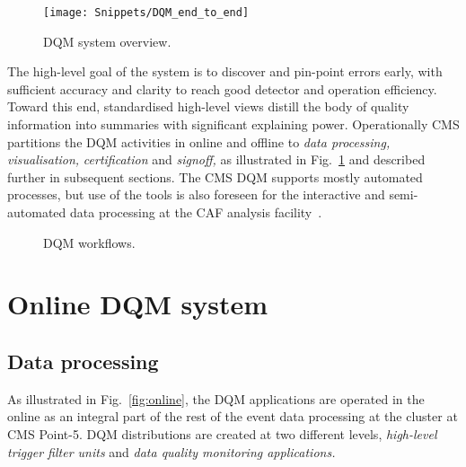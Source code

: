 \documentclass[a4paper]{jpconf}
\begin{document}
\begin{figure}[!b]
\begin{center}
\texttt{[image: Snippets/DQM\_end\_to\_end]}
\end{center}
\caption{\label{fig:overview}DQM system overview.}
\end{figure}

The high-level goal of the system is to discover and pin-point errors early,
with sufficient accuracy and clarity to reach good detector and operation
efficiency.  Toward this end, standardised high-level views distill the body
of quality information into summaries with significant explaining power.
Operationally CMS partitions the DQM activities in online and offline to {\em
  data processing,} {\em visualisation,} {\em certification} and {\em
  signoff,} as illustrated in Fig.~\ref{fig:overview} and described further in
subsequent sections.  The CMS DQM supports mostly automated processes, but use
of the tools is also foreseen for the interactive and semi-automated data
processing at the CAF analysis facility~\cite{cms_caf_09}.

\begin{figure}[!b]
\begin{center}
\hspace{1in}
\caption{\label{fig:systems}DQM workflows.}
\end{center}
\end{figure}


\section{Online DQM system}
\subsection{Data processing}

As illustrated in Fig.~\ref{fig:online}, the DQM applications are operated in
the online as an integral part of the rest of the event data processing at the
cluster at CMS Point-5.  DQM distributions are created at two different
levels, {\em high-level trigger filter units} and {\em data quality monitoring
  applications.}
\end{document}
